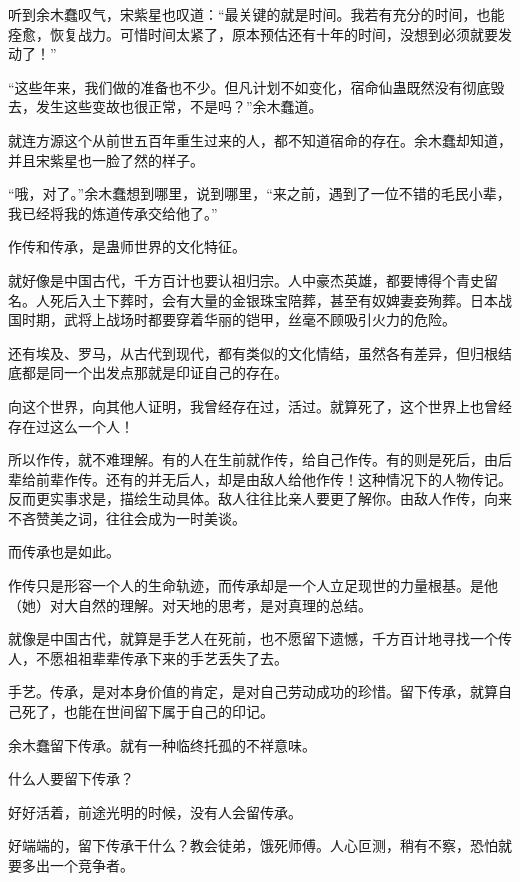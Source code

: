 
\begin{this_body}



听到余木蠢叹气，宋紫星也叹道：“最关键的就是时间。我若有充分的时间，也能痊愈，恢复战力。可惜时间太紧了，原本预估还有十年的时间，没想到必须就要发动了！”

“这些年来，我们做的准备也不少。但凡计划不如变化，宿命仙蛊既然没有彻底毁去，发生这些变故也很正常，不是吗？”余木蠢道。

就连方源这个从前世五百年重生过来的人，都不知道宿命的存在。余木蠢却知道，并且宋紫星也一脸了然的样子。

“哦，对了。”余木蠢想到哪里，说到哪里，“来之前，遇到了一位不错的毛民小辈，我已经将我的炼道传承交给他了。”

作传和传承，是蛊师世界的文化特征。

就好像是中国古代，千方百计也要认祖归宗。人中豪杰英雄，都要博得个青史留名。人死后入土下葬时，会有大量的金银珠宝陪葬，甚至有奴婢妻妾殉葬。日本战国时期，武将上战场时都要穿着华丽的铠甲，丝毫不顾吸引火力的危险。

还有埃及、罗马，从古代到现代，都有类似的文化情结，虽然各有差异，但归根结底都是同一个出发点那就是印证自己的存在。

向这个世界，向其他人证明，我曾经存在过，活过。就算死了，这个世界上也曾经存在过这么一个人！

所以作传，就不难理解。有的人在生前就作传，给自己作传。有的则是死后，由后辈给前辈作传。还有的并无后人，却是由敌人给他作传！这种情况下的人物传记。反而更实事求是，描绘生动具体。敌人往往比亲人要更了解你。由敌人作传，向来不吝赞美之词，往往会成为一时美谈。

而传承也是如此。

作传只是形容一个人的生命轨迹，而传承却是一个人立足现世的力量根基。是他（她）对大自然的理解。对天地的思考，是对真理的总结。

就像是中国古代，就算是手艺人在死前，也不愿留下遗憾，千方百计地寻找一个传人，不愿祖祖辈辈传承下来的手艺丢失了去。

手艺。传承，是对本身价值的肯定，是对自己劳动成功的珍惜。留下传承，就算自己死了，也能在世间留下属于自己的印记。

余木蠢留下传承。就有一种临终托孤的不祥意味。

什么人要留下传承？

好好活着，前途光明的时候，没有人会留传承。

好端端的，留下传承干什么？教会徒弟，饿死师傅。人心叵测，稍有不察，恐怕就要多出一个竞争者。


\end{this_body}

